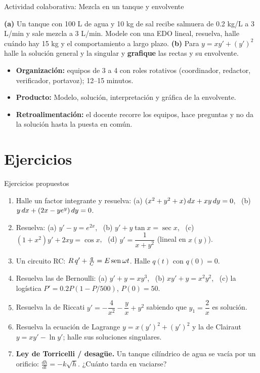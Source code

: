 \documentclass[10pt,aspectratio=169]{beamer}
\begin{document}
\begin{frame}{Actividad colaborativa: Mezcla en un tanque y envolvente}
  \small
  \begin{activa}
    \textbf{(a)} Un tanque con 100 L de agua y 10 kg de sal recibe salmuera de 0.2 kg/L a 3 L/min y sale mezcla a 3 L/min. Modele con una EDO lineal, resuelva, halle cuándo hay 15 kg y el comportamiento a largo plazo. \textbf{(b)} Para $y=xy'+(y')^2$ halle la solución general y la singular y \textbf{grafique} las rectas y su envolvente.
  \end{activa}
  \begin{itemize}
    \item \textbf{Organización:} equipos de 3 a 4 con roles rotativos (coordinador, redactor, verificador, portavoz); 12--15 minutos.
    \item \textbf{Producto:} Modelo, solución, interpretación y gráfica de la envolvente.
    \item \textbf{Retroalimentación:} el docente recorre los equipos, hace preguntas y no da la solución hasta la puesta en común.
  \end{itemize}
\end{frame}

\section{Ejercicios}

\begin{frame}{Ejercicios propuestos}
  \small
  \begin{ejercicio}
    \begin{enumerate}
      \item Halle un factor integrante y resuelva: (a) $(x^2+y^2+x)\,dx+xy\,dy=0$, \ (b) $y\,dx+(2x-ye^y)\,dy=0$.
      \item Resuelva: (a) $y'-y=e^{2x}$, \ (b) $y'+y\tan x=\sec x$, \ (c) $(1+x^2)y'+2xy=\cos x$, \ (d) $y'=\dfrac{1}{x+y^2}$ (lineal en $x(y)$).
      \item Un circuito RC: $R\,q'+\frac{q}{C}=E\operatorname{sen}\omega t$. Halle $q(t)$ con $q(0)=0$.
      \item Resuelva las de Bernoulli: (a) $y'+y=xy^3$, \ (b) $x y'+y=x^2y^2$, \ (c) la logística $P'=0.2P(1-P/500)$, $P(0)=50$.
      \item Resuelva la de Riccati $y'=-\dfrac{4}{x^2}-\dfrac yx+y^2$ sabiendo que $y_1=\dfrac2x$ es solución.
      \item Resuelva la ecuación de Lagrange $y=x(y')^2+(y')^2$ y la de Clairaut $y=xy'-\ln y'$; halle sus soluciones singulares.
      \item \textbf{Ley de Torricelli / desagüe.} Un tanque cilíndrico de agua se vacía por un orificio: $\frac{dh}{dt}=-k\sqrt h$. ¿Cuánto tarda en vaciarse?
    \end{enumerate}
  \end{ejercicio}
\end{frame}
\end{document}
